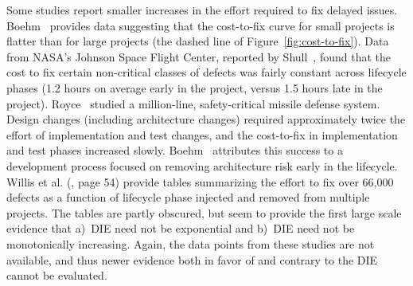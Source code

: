 \documentclass[smallcondensed]{svjour3}
\begin{document}

 
 
 




 
Some studies report smaller
 increases in the effort required to fix delayed issues.  Boehm~\cite{Boehm80} provides data suggesting that the cost-to-fix curve for small projects
 is flatter than for large projects (the dashed line of Figure~\ref{fig:cost-to-fix}). Data from NASA's Johnson Space Flight Center, reported by Shull~\cite{Shull02}, found that the cost to fix certain non-critical classes of defects was fairly constant across lifecycle phases (1.2 hours on average early in the project, versus 1.5 hours late in the project). Royce~\cite{Royce98} studied  a million-line, safety-critical missile defense system. Design changes (including architecture changes) required approximately twice the effort of implementation and test changes, and the cost-to-fix in implementation and test phases increased slowly. Boehm~\cite{Boehm10} attributes this success to a development process focused on removing architecture risk early in the lifecycle. Willis et al. (\cite{willis1998hughes}, page 54) provide tables summarizing the effort to fix over 66,000 defects as a function of lifecycle phase injected and removed from multiple projects. The tables are partly obscured, but seem to provide the first large scale evidence that a)~DIE need not be exponential and b)~DIE need not be monotonically increasing.  Again, the data points from these studies are not available, and thus newer evidence both in favor of and contrary to the DIE cannot be evaluated.
\end{document}
